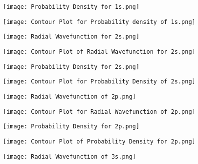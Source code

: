 \documentclass[11pt]{article}
\begin{document}
	\begin{figure}[H]
		\centering
		\texttt{[image: Probability Density for 1s.png]}
		\label{figure:PD1s}
	\end{figure}

	\begin{figure}[H]
		\centering
		\texttt{[image: Contour Plot for Probability density of 1s.png]}
		\label{figure:CPD1s}
	\end{figure}
	
	\begin{figure}[H]
		\centering
		\texttt{[image: Radial Wavefunction for 2s.png]}
		\label{figure:RW2s}
	\end{figure}

	\begin{figure}[H]
	\centering
	\texttt{[image: Contour Plot of Radial Wavefunction for 2s.png]}
	\label{figure:CRW2s}
	\end{figure}

	\begin{figure}[H]
		\centering
		\texttt{[image: Probability Density for 2s.png]}
		\label{figure:PD2s}
	\end{figure}

	\begin{figure}[H]
	\centering
	\texttt{[image: Contour Plot for Probability Density of 2s.png]}
	\label{figure:CPD2s}
	\end{figure}

	\begin{figure}[H]
	\centering
	\texttt{[image: Radial Wavefunction of 2p.png]}
	\label{figure:RW2p}
	\end{figure}

	\begin{figure}[H]
	\centering
	\texttt{[image: Contour Plot for Radial Wavefunction of 2p.png]}
	\label{figure:CRW2p}
	\end{figure}

	\begin{figure}[H]
	\centering
	\texttt{[image: Probability Density for 2p.png]}
	\label{figure:PD2p}
	\end{figure}

	\begin{figure}[H]
	\centering
	\texttt{[image: Contour Plot of Probability Density for 2p.png]}
	\label{figure:CPD2p}
	\end{figure}

	\begin{figure}[H]
	\centering
	\texttt{[image: Radial Wavefunction of 3s.png]}
	\label{figure:RW3s}
	\end{figure}
\end{document}
